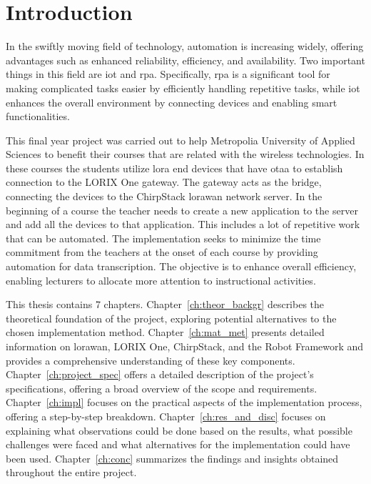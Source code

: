 
\chapter{Introduction}

In the swiftly moving field of technology, automation is increasing widely, offering advantages such as enhanced reliability, efficiency, and availability.
Two important things in this field are  \gls{iot} and \gls{rpa}. Specifically, \gls{rpa} is a significant tool for making complicated tasks easier by efficiently handling repetitive tasks, while \gls{iot} enhances the overall environment by connecting devices and enabling smart functionalities. 

This final year project was carried out to help Metropolia University of Applied Sciences to benefit their courses that are related with the wireless technologies.
In these courses the students utilize \gls{lora} end devices that have \gls{otaa} to establish connection to the LORIX One gateway.
The gateway acts as the bridge, connecting the devices to the ChirpStack \gls{lorawan} network server.
In the beginning of a course the teacher needs to create a new application to the server and add all the devices to that application.
This includes a lot of repetitive work that can be automated.
The implementation seeks to minimize the time commitment from the teachers at the onset of each course by providing automation for data transcription.
The objective is to enhance overall efficiency, enabling lecturers to allocate more attention to instructional activities.

This thesis contains 7 chapters.
Chapter~\ref{ch:theor_backgr} describes the theoretical foundation of the project, exploring potential alternatives to the chosen implementation method.
Chapter~\ref{ch:mat_met} presents detailed information on \gls{lorawan}, LORIX One, ChirpStack, and the Robot Framework and provides a comprehensive understanding of these key components.
Chapter~\ref{ch:project_spec} offers a detailed description of the project's specifications, offering a broad overview of the scope and requirements. 
Chapter~\ref{ch:impl} focuses on the practical aspects of the implementation process, offering a step-by-step breakdown.
Chapter~\ref{ch:res_and_disc} focuses on explaining what observations could be done based on the results, what possible challenges were faced and what alternatives for the implementation could have been used.
Chapter~\ref{ch:conc} summarizes the findings and insights obtained throughout the entire project.


\clearpage %
